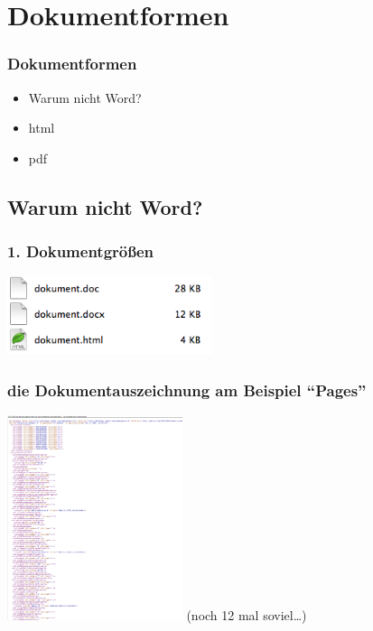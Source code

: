 \section{Dokumentformen}
		\begin{frame}
			\frametitle{Dokumentformen}
			\begin{itemize}
				\item Warum nicht Word?
				\item html
				\item pdf
			\end{itemize}
		\end{frame}

  \subsection{Warum nicht Word?}

  \begin{frame}
    \frametitle{1. Dokumentgrößen}
    \begin{center}
      \includegraphics[width=6cm]{pics/Finder.png}
    \end{center}
  \end{frame}

  \begin{frame}
    \frametitle{die Dokumentauszeichnung am Beispiel ``Pages''}
      \begin{center}
        \includegraphics[height=6cm]{pics/auszeichnung.png}
        (noch 12 mal soviel\ldots)
      \end{center}
  \end{frame}

